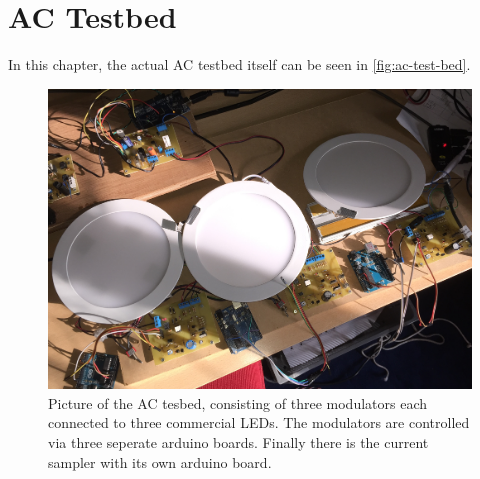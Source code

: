 
\chapter{AC Testbed}
\label{app:ac-test-bed}

In this chapter, the actual AC testbed itself can be seen in \autoref{fig:ac-test-bed}.

\begin{figure}[htb]
	\includegraphics[angle=90,width=\textwidth,height=.9\textheight,keepaspectratio]{chapters/appendix/ac-test-bed/ac-test-bed.JPG}
	\caption{Picture of the AC tesbed, consisting of three modulators each connected to three commercial LEDs. The modulators are controlled via three seperate arduino boards. Finally there is the current sampler with its own arduino board.}
	\label{fig:ac-test-bed}
\end{figure}

